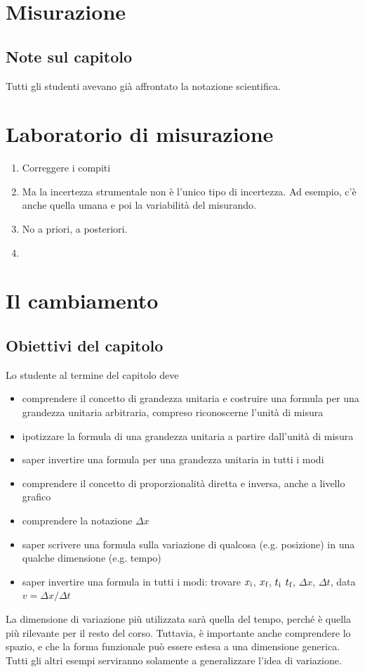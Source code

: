 \documentclass[11pt]{report}
\begin{document}
\chapter{Misurazione}
\section{Note sul capitolo}
Tutti gli studenti avevano già affrontato la notazione scientifica.

\chapter{Laboratorio di misurazione}
\begin{enumerate}
    \item Correggere i compiti
    \item Ma la incertezza strumentale non è l'unico tipo di incertezza. Ad esempio, c'è anche quella umana e poi la variabilità del misurando.
    \item No a priori, a posteriori.
    \item 
\end{enumerate}
\chapter{Il cambiamento}

\section*{Obiettivi del capitolo}
Lo studente al termine del capitolo deve
\begin{itemize}
    \item comprendere il concetto di grandezza unitaria e costruire una formula per una grandezza unitaria arbitraria, compreso riconoscerne l'unità di misura
    \item ipotizzare la formula di una grandezza unitaria a partire dall'unità di misura
    \item saper invertire una formula per una grandezza unitaria in tutti i modi
    \item comprendere il concetto di proporzionalità diretta e inversa, anche a livello grafico
    \item comprendere la notazione $\Delta x$
    \item saper scrivere una formula sulla variazione di qualcosa (e.g. posizione) in una qualche dimensione (e.g. tempo)
    \item saper invertire una formula in tutti i modi: trovare $x_{\textup{i}}$, $x_{\textup{f}}$, $t_{\textup{i}}$ $t_{\textup{f}}$, $\Delta x$, $\Delta t$, data $v=\Delta x/\Delta t$
\end{itemize}
La dimensione di variazione più utilizzata sarà quella del tempo, perché è quella più rilevante per il resto del corso. Tuttavia, è importante anche comprendere lo spazio, e che la forma funzionale può essere estesa a una dimensione generica. Tutti gli altri esempi serviranno solamente a generalizzare l'idea di variazione.
\end{document}

